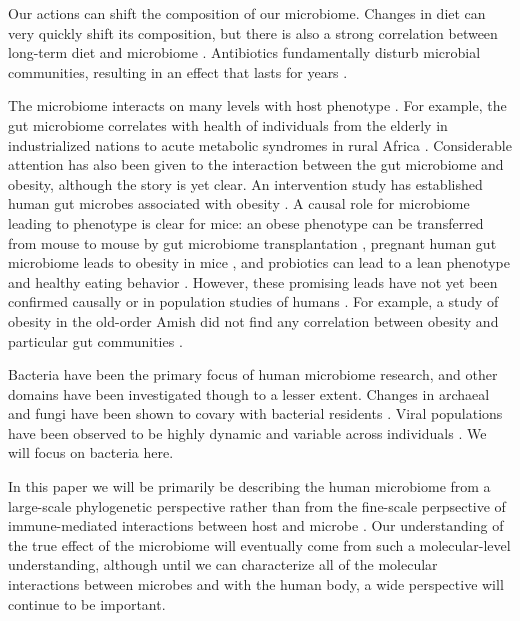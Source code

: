 \documentclass{amsart}
\begin{document}
Our actions can shift the composition of our microbiome.
Changes in diet can very quickly shift its composition, but there is also a strong correlation between long-term diet and microbiome \citep{li2009human,wu2011linking}.
Antibiotics fundamentally disturb microbial communities, resulting in an effect that lasts for years \citep{jernberg2007long,dethlefsen2008pervasive,jakobsson2010short,dethlefsen2011incomplete}.

The microbiome interacts on many levels with host phenotype \citep[reviewed in][]{cho2012human}.
For example, the gut microbiome correlates with health of individuals from the elderly in industrialized nations \citep{claesson2012gut} to acute metabolic syndromes in rural Africa \citep{smith2013gut}.
Considerable attention has also been given to the interaction between the gut microbiome and obesity, although the story is yet clear.
An intervention study has established human gut microbes associated with obesity \citep{ley2006microbial}.
A causal role for microbiome leading to phenotype is clear for mice: an obese phenotype can be transferred from mouse to mouse by gut microbiome transplantation \citep{turnbaugh2006obesity}, pregnant human gut microbiome leads to obesity in mice \citep{koren2012host}, and probiotics can lead to a lean phenotype and healthy eating behavior \citep{poutahidis2013microbial}.
However, these promising leads have not yet been confirmed causally or in population studies of humans \citep{zhao2013gut}.
For example, a study of obesity in the old-order Amish did not find any correlation between obesity and particular gut communities \citep{zupancic2012analysis}.

Bacteria have been the primary focus of human microbiome research, and other domains have been investigated though to a lesser extent.
Changes in archaeal and fungi have been shown to covary with bacterial residents \citep{hoffmann2013archaea}.
Viral populations have been observed to be highly dynamic and variable across individuals \citep{reyes2010viruses,minot2011human,minot2013rapid}.
We will focus on bacteria here.

In this paper we will be primarily be describing the human microbiome from a large-scale phylogenetic perspective rather than from the fine-scale perpsective of immune-mediated interactions between host and microbe \citep[reviewed in][]{hooper2012interactions}.
Our understanding of the true effect of the microbiome will eventually come from such a molecular-level understanding, although until we can characterize all of the molecular interactions between microbes and with the human body, a wide perspective will continue to be important.
\end{document}

